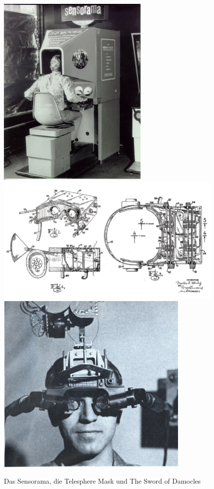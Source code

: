 \begin{figure}[h]
	\centering
	\includegraphics[width=0.22\linewidth]{Bilder/A14_Sensorama}
	\includegraphics[width=0.3\linewidth]{Bilder/A15_TelesphereMask}
	\includegraphics[width=0.3\linewidth]{Bilder/A16_SwordDamocles}
	\caption{Das Sensorama, die Telesphere Mask und The Sword of Damocles \cite{A14,A15,A16}}
	\label{fig:SensoramaTelesphereSword}
\end{figure}

